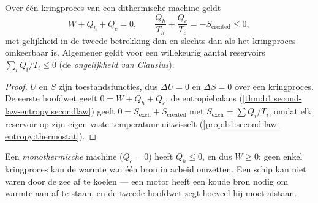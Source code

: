 \begin{theorem}\label{thm:b1:heat-engines:clausius}
Over één kringproces van een dithermische machine geldt
\[
W + Q_h + Q_c = 0 , \qquad
\frac{Q_h}{T_h} + \frac{Q_c}{T_c} = -S_{\mathrm{created}} \leq 0 ,
\]
met gelijkheid in de tweede betrekking dan en slechts dan als het kringproces
omkeerbaar is. Algemener geldt voor een willekeurig aantal reservoirs
$\sum_i Q_i/T_i \leq 0$ (de \emph{ongelijkheid van Clausius}).
\end{theorem}

\begin{proof}
$U$ en $S$ zijn toestandsfuncties, dus $\Delta U = 0$ en $\Delta S = 0$ over
een kringproces. De eerste hoofdwet geeft $0 = W + Q_h + Q_c$; de entropiebalans
(\cref{thm:b1:second-law-entropy:secondlaw}) geeft $0 = S_{\mathrm{exch}} +
S_{\mathrm{created}}$ met $S_{\mathrm{exch}} = \sum Q_i/T_i$, omdat elk
reservoir op zijn eigen vaste temperatuur uitwisselt
(\cref{prop:b1:second-law-entropy:thermostat}).
\end{proof}

\begin{corollary}\label{cor:b1:heat-engines:kelvin}
Een \emph{monothermische} machine ($Q_c = 0$) heeft $Q_h \leq 0$, en dus $W \geq 0$:
geen enkel kringproces kan de warmte van één bron in arbeid omzetten. Een schip
kan niet varen door de zee af te koelen --- een motor heeft een koude bron nodig om
warmte aan af te staan, en de tweede hoofdwet zegt hoeveel hij moet afstaan.
\end{corollary}

